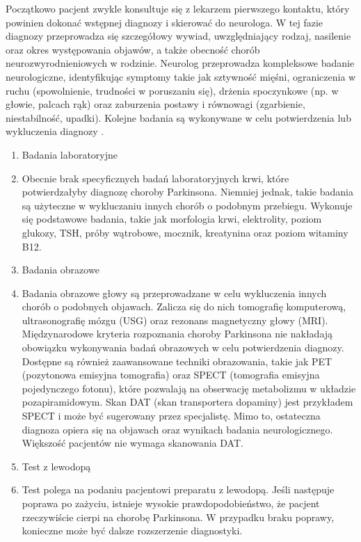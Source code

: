 Początkowo pacjent zwykle konsultuje się z lekarzem pierwszego kontaktu, który powinien dokonać wstępnej diagnozy i skierować do neurologa.
W tej fazie diagnozy przeprowadza się szczegółowy wywiad, uwzględniający rodzaj, nasilenie oraz okres występowania objawów, a także
obecność chorób neurozwyrodnieniowych w rodzinie.
Neurolog przeprowadza kompleksowe badanie neurologiczne, identyfikując symptomy takie jak sztywność mięśni, ograniczenia w
ruchu (spowolnienie, trudności w poruszaniu się), drżenia spoczynkowe (np. w głowie, palcach rąk) oraz zaburzenia postawy i równowagi
(zgarbienie, niestabilność, upadki). Kolejne badania są wykonywane w celu potwierdzenia lub wykluczenia diagnozy \cite{diagnostyka_Sitek, Loscalzo_2022}.

\renewcommand{\labelenumi}{\alph{enumi})}
\begin{enumerate}
	\item Badania laboratoryjne
	\item[] Obecnie brak specyficznych badań laboratoryjnych krwi, które potwierdzałyby diagnozę choroby Parkinsona.
Niemniej jednak, takie badania są użyteczne w wykluczaniu innych chorób o podobnym przebiegu.
Wykonuje się podstawowe badania, takie jak morfologia krwi, elektrolity, poziom glukozy, TSH, próby wątrobowe, mocznik, kreatynina oraz poziom witaminy B12.

	\item Badania obrazowe
	\item[] Badania obrazowe głowy są przeprowadzane w celu wykluczenia innych chorób o podobnych objawach.
Zalicza się do nich tomografię komputerową, ultrasonografię mózgu (USG) oraz rezonans magnetyczny głowy (MRI).
Międzynarodowe kryteria rozpoznania choroby Parkinsona nie nakładają obowiązku wykonywania badań obrazowych w celu potwierdzenia diagnozy.
Dostępne są również zaawansowane techniki obrazowania, takie jak PET (pozytonowa emisyjna tomografia) oraz SPECT (tomografia emisyjna pojedynczego fotonu), które pozwalają na obserwację metabolizmu w układzie pozapiramidowym. Skan DAT (skan transportera dopaminy) jest przykładem SPECT i może być sugerowany przez specjalistę.
Mimo to, ostateczna diagnoza opiera się na objawach oraz wynikach badania neurologicznego. Większość pacjentów nie wymaga skanowania DAT.

	\item Test z lewodopą
	\item[]Test polega na podaniu pacjentowi  preparatu z lewodopą.
Jeśli następuje poprawa po zażyciu, istnieje wysokie prawdopodobieństwo, że pacjent rzeczywiście cierpi na chorobę Parkinsona.
W przypadku braku poprawy, konieczne może być dalsze rozszerzenie diagnostyki.


\end{enumerate}
